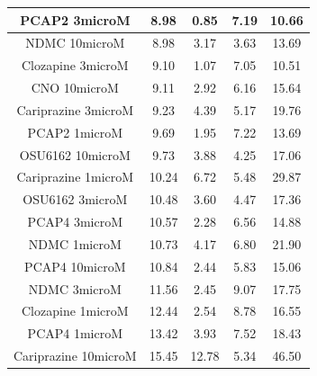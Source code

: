 \documentclass[a4paper,12pt]{article}
\begin{document}
\begin{table}[h!]
\begin{tabular}{|c|c|c|c|c|}
PCAP2 3microM         & 8.98  & 0.85  & 7.19 & 10.66 \\ \hline
NDMC 10microM         & 8.98  & 3.17  & 3.63 & 13.69 \\ \hline
Clozapine 3microM     & 9.10   & 1.07  & 7.05 & 10.51 \\ \hline
CNO 10microM          & 9.11  & 2.92  & 6.16 & 15.64 \\ \hline
Cariprazine 3microM   & 9.23  & 4.39  & 5.17 & 19.76 \\ \hline
PCAP2 1microM         & 9.69  & 1.95  & 7.22 & 13.69 \\ \hline
OSU6162 10microM      & 9.73  & 3.88  & 4.25 & 17.06 \\ \hline
Cariprazine 1microM   & 10.24 & 6.72  & 5.48 & 29.87 \\ \hline
OSU6162 3microM       & 10.48 & 3.60   & 4.47 & 17.36 \\ \hline
PCAP4 3microM       & 10.57 & 2.28  & 6.56 & 14.88 \\ \hline
NDMC 1microM          & 10.73 & 4.17  & 6.80  & 21.90  \\ \hline
PCAP4 10microM      & 10.84 & 2.44  & 5.83 & 15.06 \\ \hline
NDMC 3microM          & 11.56 & 2.45  & 9.07 & 17.75 \\ \hline
Clozapine 1microM     & 12.44 & 2.54  & 8.78 & 16.55 \\ \hline
PCAP4 1microM       & 13.42 & 3.93  & 7.52 & 18.43 \\ \hline
Cariprazine 10microM  & 15.45 & 12.78 & 5.34 & 46.50  \\\hline
\end{tabular}
\end{table}
\newpage
\end{document}
